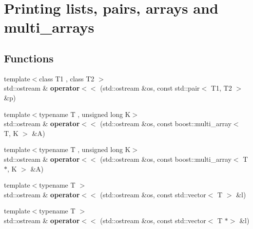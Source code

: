 \hypertarget{group__print__multi__arrays}{}\section{Printing lists, pairs, arrays and multi\+\_\+arrays}
\label{group__print__multi__arrays}
\subsection*{Functions}
\begin{DoxyCompactItemize}
\item 
\mbox{\label{group__print__multi__arrays_gac6bb2234380f5ff37ab6fdbe44d9d166}} 
{\footnotesize template$<$class T1 , class T2 $>$ }\\std\+::ostream \& {\bfseries operator$<$$<$} (std\+::ostream \&os, const std\+::pair$<$ T1, T2 $>$ \&p)
\item 
\mbox{\label{group__print__multi__arrays_ga56b01637b2940f2a4c2a195a49739f46}} 
{\footnotesize template$<$typename T , unsigned long K$>$ }\\std\+::ostream \& {\bfseries operator$<$$<$} (std\+::ostream \&os, const boost\+::multi\+\_\+array$<$ T, K $>$ \&A)
\item 
\mbox{\label{group__print__multi__arrays_ga02ec40e6bdd55e6ec729252c96a657ff}} 
{\footnotesize template$<$typename T , unsigned long K$>$ }\\std\+::ostream \& {\bfseries operator$<$$<$} (std\+::ostream \&os, const boost\+::multi\+\_\+array$<$ T $\ast$, K $>$ \&A)
\item 
\mbox{\label{group__print__multi__arrays_gae59b730e239dcb76e9bd17544ddf3106}} 
{\footnotesize template$<$typename T $>$ }\\std\+::ostream \& {\bfseries operator$<$$<$} (std\+::ostream \&os, const std\+::vector$<$ T $>$ \&l)
\item 
\mbox{\label{group__print__multi__arrays_gacbae03599937062b6a852469d9e0955e}} 
{\footnotesize template$<$typename T $>$ }\\std\+::ostream \& {\bfseries operator$<$$<$} (std\+::ostream \&os, const std\+::vector$<$ T $\ast$$>$ \&l)
$$
\end{DoxyCompactItemize}
